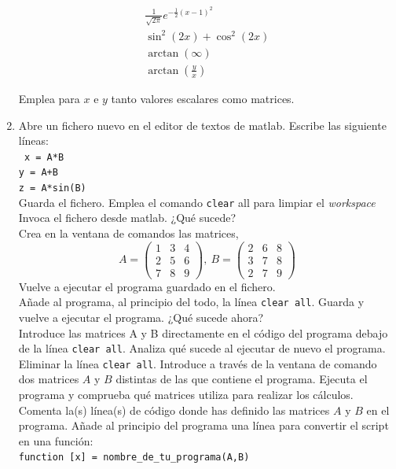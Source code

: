 \begin{enumerate}
\begin{multicols}{2}
\begin{align*}
\frac{1}{\sqrt{2\pi}}e^{-\frac{1}{2}(x-1)^2}\\
\sin^2(2x)+\cos^2(2x) \\
\arctan(\infty)\\
\arctan\left(\frac{y}{x}\right)
\end{align*}
\end{multicols}
Emplea para $x$ e $y$ tanto valores escalares como matrices.

\item Abre un fichero nuevo en el editor de textos de matlab.
Escribe las siguiente líneas:\\
\texttt{
x = A*B\\
y = A+B\\
z = A*sin(B)}\\
Guarda el fichero. Emplea el comando \verb|clear| all para limpiar el \emph{workspace}
Invoca el fichero desde matlab. ¿Qué sucede?\\
Crea en la ventana de comandos las matrices,
\begin{equation*}
A =\begin{pmatrix}
1&3&4\\
2&5&6\\
7&8&9
\end{pmatrix}, \ B=\begin{pmatrix}
2&6&8\\
3&7&8\\
2&7&9
\end{pmatrix}
\end{equation*}
Vuelve a ejecutar el programa guardado en el fichero.\\
Añade al programa, al principio del todo, la línea \texttt{clear all}. Guarda y vuelve a ejecutar el
programa. ¿Qué sucede ahora?\\
Introduce las matrices A y B directamente en el código del programa debajo de la línea \texttt{clear all}. Analiza qué sucede al ejecutar de nuevo el programa.\\
 Eliminar la línea \texttt{clear all}. Introduce a través de la ventana de comando dos matrices $A$ y $B$ distintas de las que contiene el programa. Ejecuta el programa y comprueba qué matrices utiliza para realizar los cálculos.\\
Comenta la(s) línea(s) de código donde has definido las matrices $A$ y $B$ en el programa. Añade al principio del programa una línea para convertir el script en una función:\\
\verb|function [x] = nombre_de_tu_programa(A,B)| \\

\end{enumerate}
